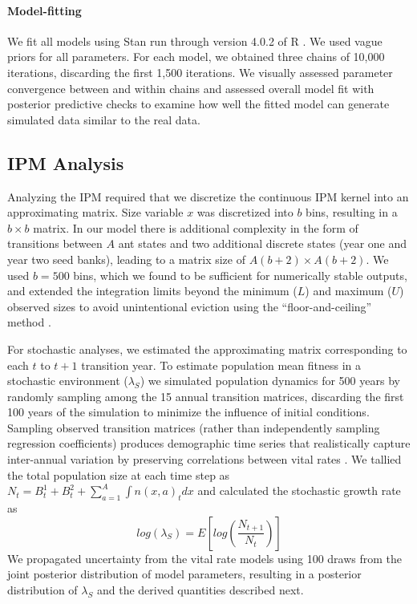 \documentclass[11pt]{article}
\begin{document}
\paragraph{Model-fitting}
We fit all models using Stan run through version 4.0.2 of R \citep{Rcite,Rstancite}. 
We used vague priors for all parameters. 
For each model, we obtained three chains of 10,000 iterations, discarding the first 1,500 iterations. 
We visually assessed parameter convergence between and within chains and assessed overall model fit with posterior predictive checks to examine how well the fitted model can generate simulated data similar to the real data.

\subsection*{IPM Analysis}
Analyzing the IPM required that we discretize the continuous IPM kernel into an approximating matrix. 
Size variable $x$ was discretized into $b$ bins, resulting in a $b \times b$ matrix.
In our model there is additional complexity in the form of transitions between $A$ ant states and two additional discrete states (year one and year two seed banks), leading to a matrix size of $A(b+2) \times A(b+2)$.
We used $b = 500$ bins, which we found to be sufficient for numerically stable outputs, and extended the integration limits beyond the minimum ($L$) and maximum ($U$) observed sizes to avoid unintentional eviction using the ``floor-and-ceiling'' method \citep{Williams2012}. 

For stochastic analyses, we estimated the approximating matrix corresponding to each $t$ to $t+1$ transition year. 
To estimate population mean fitness in a stochastic environment ($\lambda_{S}$) we simulated population dynamics for 500 years by randomly sampling among the 15 annual transition matrices, discarding the first 100 years of the simulation to minimize the influence of initial conditions. 
Sampling observed transition matrices (rather than independently sampling regression coefficients) produces demographic time series that realistically capture inter-annual variation by preserving correlations between vital rates \citep{metcalf2015statistical}.
We tallied the total population size at each time step as  $N_{t} = B^1_{t} + B^2_{t} + \sum_{a=1}^{A}\int n(x,a)_{t}dx$ and calculated the stochastic growth rate as 
$$log(\lambda_S) = E[log(\frac{N_{t+1}}{N_{t}})]$$ \citep{Rees2009}
We propagated uncertainty from the vital rate models using 100 draws from the joint posterior distribution of model parameters, resulting in a posterior distribution of $\lambda_{S}$ and the derived quantities described next.
\end{document}
